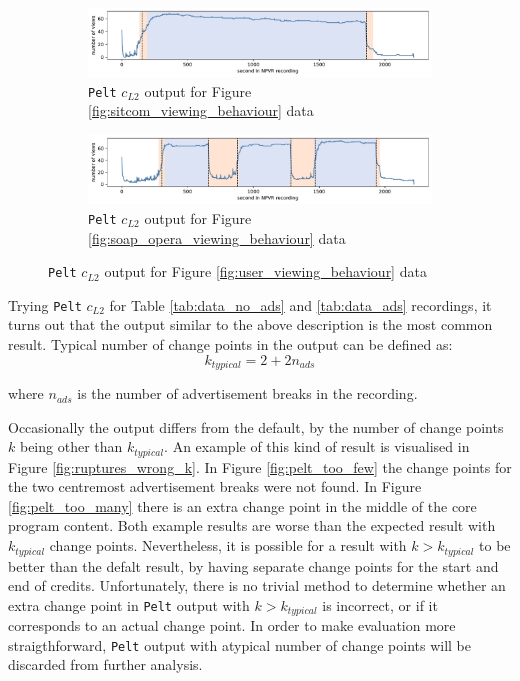 \begin{figure}[H]
    \par\bigskip
    \centering
    \begin{subfigure}[b]{\textwidth}
       \includegraphics[width=1\textwidth]{../plots/sitcom-pelt_l2_pen30000.pdf}
       \caption{\texttt{Pelt} $c_{L2}$ output for Figure \ref{fig:sitcom_viewing_behaviour} data}
       \label{fig:pelt_sitcom} 
    \end{subfigure}
    \par\bigskip
    \begin{subfigure}[b]{\textwidth}
       \includegraphics[width=1\textwidth]{../plots/soap_opera-pelt_l2_pen30000.pdf}
       \caption{\texttt{Pelt} $c_{L2}$ output for Figure \ref{fig:soap_opera_viewing_behaviour} data}
       \label{fig:pelt_soap_opera}
    \end{subfigure}
    \caption{\texttt{Pelt} $c_{L2}$ output for Figure \ref{fig:user_viewing_behaviour} data}
    \label{fig:ruptures_change_detection}
\end{figure} 

Trying \texttt{Pelt} $c_{L2}$ for Table \ref{tab:data_no_ads} and \ref{tab:data_ads} recordings, it turns out that the output similar to the above description is the most common result. Typical number of change points in the output can be defined as:
\begin{equation}
    k_{typical}=2+2n_{ads}
    \label{eq:k_typical}
\end{equation}

where $n_{ads}$ is the number of advertisement breaks in the recording.

Occasionally the output differs from the default, by the number of change points $k$ being other than $k_{typical}$. An example of this kind of result is visualised in Figure \ref{fig:ruptures_wrong_k}. In Figure \ref{fig:pelt_too_few} the change points for the two centremost advertisement breaks were not found. In Figure \ref{fig:pelt_too_many} there is an extra change point in the middle of the core program content. Both example results are worse than the expected result with $k_{typical}$ change points. Nevertheless, it is possible for a result with $k > k_{typical}$ to be better than the defalt result, by having separate change points for the start and end of credits. Unfortunately, there is no trivial method to determine whether an extra change point in \texttt{Pelt} output with $k > k_{typical}$ is incorrect, or if it corresponds to an actual change point. In order to make evaluation more straigthforward, \texttt{Pelt} output with atypical number of change points will be discarded from further analysis.

